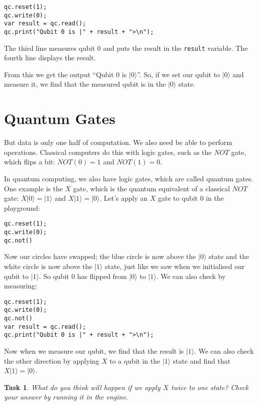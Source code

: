 \documentclass[twocolumn]{article}
\newtheorem{task}{Task}[section]
\begin{document}
\begin{lstlisting}
qc.reset(1);
qc.write(0);
var result = qc.read();
qc.print("Qubit 0 is |" + result + ">\n");
\end{lstlisting}

The third line measures qubit $0$ and puts the result in the \texttt{result} variable. The fourth line displays the result.

From this we get the output ``Qubit $0$ is $|0\rangle$''. So, if we set our qubit to $|0\rangle$ and measure it, we find that the measured qubit is in the $|0\rangle$ state.

\section{Quantum Gates}

But data is only one half of computation. We also need be able to perform operations. Classical computers do this with logic gates, such as the $NOT$ gate, which flips a bit: $NOT(0) = 1$ and $NOT(1) = 0$.

In quantum computing, we also have logic gates, which are called quantum gates. One example is the $X$ gate, which is the quantum equivalent of a classical $NOT$ gate: $X|0\rangle = |1\rangle$ and $X|1\rangle = |0\rangle$. Let's apply an $X$ gate to qubit $0$ in the playground:

\begin{lstlisting}
qc.reset(1);
qc.write(0);
qc.not()
\end{lstlisting}

Now our circles have swapped; the blue circle is now above the $|0\rangle$ state and the white circle is now above the $|1\rangle$ state, just like we saw when we initialised our qubit to $|1\rangle$. So qubit $0$ has flipped from $|0\rangle$ to $|1\rangle$. We can also check by measuring:

\begin{lstlisting}
qc.reset(1);
qc.write(0);
qc.not()
var result = qc.read();
qc.print("Qubit 0 is |" + result + ">\n");
\end{lstlisting}

Now when we measure our qubit, we find that the result is $|1\rangle$. We can also check the other direction by applying $X$ to a qubit in the $|1\rangle$ state and find that $X|1\rangle = |0\rangle$.

\begin{task}
What do you think will happen if we apply $X$ twice to one state? Check your answer by running it in the engine.
\end{task}
\end{document}

